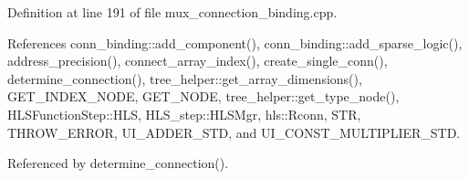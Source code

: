 Definition at line 191 of file mux\+\_\+connection\+\_\+binding.\+cpp.



References conn\+\_\+binding\+::add\+\_\+component(), conn\+\_\+binding\+::add\+\_\+sparse\+\_\+logic(), address\+\_\+precision(), connect\+\_\+array\+\_\+index(), create\+\_\+single\+\_\+conn(), determine\+\_\+connection(), tree\+\_\+helper\+::get\+\_\+array\+\_\+dimensions(), G\+E\+T\+\_\+\+I\+N\+D\+E\+X\+\_\+\+N\+O\+DE, G\+E\+T\+\_\+\+N\+O\+DE, tree\+\_\+helper\+::get\+\_\+type\+\_\+node(), H\+L\+S\+Function\+Step\+::\+H\+LS, H\+L\+S\+\_\+step\+::\+H\+L\+S\+Mgr, hls\+::\+Rconn, S\+TR, T\+H\+R\+O\+W\+\_\+\+E\+R\+R\+OR, U\+I\+\_\+\+A\+D\+D\+E\+R\+\_\+\+S\+TD, and U\+I\+\_\+\+C\+O\+N\+S\+T\+\_\+\+M\+U\+L\+T\+I\+P\+L\+I\+E\+R\+\_\+\+S\+TD.



Referenced by determine\+\_\+connection().

